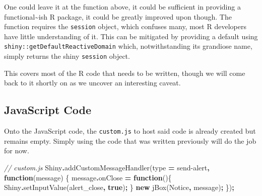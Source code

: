 \documentclass[
]{krantz}
\makeatletter
\newenvironment{Shaded}{\begin{snugshade}}{\end{snugshade}}
\newcommand{\AttributeTok}[1]{\textcolor[rgb]{0.61,0.61,0.61}{#1}}
\newcommand{\CommentTok}[1]{\textcolor[rgb]{0.37,0.37,0.37}{\textit{#1}}}
\newcommand{\ControlFlowTok}[1]{\textcolor[rgb]{0.27,0.27,0.27}{\textbf{#1}}}
\newcommand{\DataTypeTok}[1]{\textcolor[rgb]{0.27,0.27,0.27}{#1}}
\newcommand{\FunctionTok}[1]{\textcolor[rgb]{0,0,0}{#1}}
\newcommand{\KeywordTok}[1]{\textcolor[rgb]{0.27,0.27,0.27}{\textbf{#1}}}
\newcommand{\NormalTok}[1]{#1}
\newcommand{\OperatorTok}[1]{\textcolor[rgb]{0.43,0.43,0.43}{\textbf{#1}}}
\newcommand{\StringTok}[1]{\textcolor[rgb]{0.5,0.5,0.5}{#1}}
\newenvironment{kframe}{%
\medskip{}
\setlength{\fboxsep}{.8em}
 \def\at@end@of@kframe{}%
 \ifinner\ifhmode%
  \def\at@end@of@kframe{\end{minipage}}%
  \begin{minipage}{\columnwidth}%
 \fi\fi%
 \def\FrameCommand##1{\hskip\@totalleftmargin \hskip-\fboxsep
 \colorbox{shadecolor}{##1}\hskip-\fboxsep
     \hskip-\linewidth \hskip-\@totalleftmargin \hskip\columnwidth}%
 \MakeFramed {\advance\hsize-\width
   \@totalleftmargin\z@ \linewidth\hsize
   \@setminipage}}%
 {\par\unskip\endMakeFramed%
 \at@end@of@kframe}
\renewenvironment{Shaded}{\begin{kframe}}{\end{kframe}}
\makeatother
\begin{document}
One could leave it at the function above, it could be sufficient in providing a functional\textasciitilde ish R package, it could be greatly improved upon though. The function requires the \texttt{session} object, which confuses many, most R developers have little understanding of it. This can be mitigated by providing a default using \texttt{shiny::getDefaultReactiveDomain} which, notwithstanding its grandiose name, simply returns the shiny \texttt{session} object.

\begin{Shaded}
\end{Shaded}

This covers most of the R code that needs to be written, though we will come back to it shortly on as we uncover an interesting caveat.

\hypertarget{javascript-code}{%
\subsection*{JavaScript Code}\label{javascript-code}}


Onto the JavaScript code, the \texttt{custom.js} to host said code is already created but remains empty. Simply using the code that was written previously will do the job for now.

\begin{Shaded}
\begin{Highlighting}[]
\CommentTok{// custom.js}
\NormalTok{Shiny}\OperatorTok{.}\FunctionTok{addCustomMessageHandler}\NormalTok{(type }\OperatorTok{=} \StringTok{\textquotesingle{}send{-}alert\textquotesingle{}}\OperatorTok{,} \KeywordTok{function}\NormalTok{(message) \{}
\NormalTok{  message}\OperatorTok{.}\AttributeTok{onClose} \OperatorTok{=} \KeywordTok{function}\NormalTok{()\{}
\NormalTok{    Shiny}\OperatorTok{.}\FunctionTok{setInputValue}\NormalTok{(}\StringTok{\textquotesingle{}alert\_close\textquotesingle{}}\OperatorTok{,} \KeywordTok{true}\NormalTok{)}\OperatorTok{;}
\NormalTok{  \}}
  \KeywordTok{new}\NormalTok{ jBox(}\StringTok{\textquotesingle{}Notice\textquotesingle{}}\OperatorTok{,}\NormalTok{ message)}\OperatorTok{;}
\NormalTok{\})}\OperatorTok{;}
\end{Highlighting}
\end{Shaded}
\end{document}
